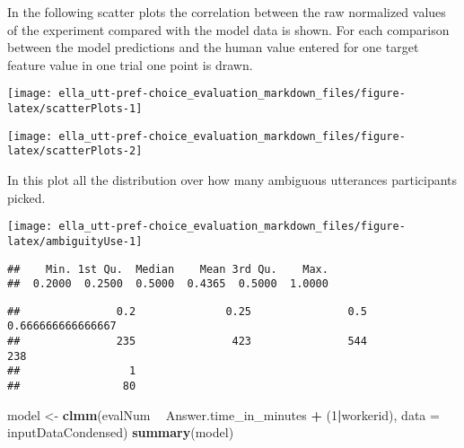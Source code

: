 \documentclass[]{article}
\newenvironment{Shaded}{\begin{snugshade}}{\end{snugshade}}
\newcommand{\DataTypeTok}[1]{\textcolor[rgb]{0.13,0.29,0.53}{#1}}
\newcommand{\DecValTok}[1]{\textcolor[rgb]{0.00,0.00,0.81}{#1}}
\newcommand{\KeywordTok}[1]{\textcolor[rgb]{0.13,0.29,0.53}{\textbf{#1}}}
\newcommand{\NormalTok}[1]{#1}
\newcommand{\OperatorTok}[1]{\textcolor[rgb]{0.81,0.36,0.00}{\textbf{#1}}}
\newcommand{\StringTok}[1]{\textcolor[rgb]{0.31,0.60,0.02}{#1}}
\begin{document}
In the following scatter plots the correlation between the raw
normalized values of the experiment compared with the model data is
shown. For each comparison between the model predictions and the human
value entered for one target feature value in one trial one point is
drawn.

\begin{center}\texttt{[image: ella\_utt-pref-choice\_evaluation\_markdown\_files/figure-latex/scatterPlots-1]} \end{center}

\begin{center}\texttt{[image: ella\_utt-pref-choice\_evaluation\_markdown\_files/figure-latex/scatterPlots-2]} \end{center}

In this plot all the distribution over how many ambiguous utterances
participants picked.

\begin{center}\texttt{[image: ella\_utt-pref-choice\_evaluation\_markdown\_files/figure-latex/ambiguityUse-1]} \end{center}

\begin{Shaded}
\end{Shaded}

\begin{verbatim}
##    Min. 1st Qu.  Median    Mean 3rd Qu.    Max. 
##  0.2000  0.2500  0.5000  0.4365  0.5000  1.0000
\end{verbatim}

\begin{Shaded}
\end{Shaded}

\begin{verbatim}
##               0.2              0.25               0.5 0.666666666666667 
##               235               423               544               238 
##                 1 
##                80
\end{verbatim}

\begin{Shaded}
\begin{Highlighting}[]
\NormalTok{model <-}\StringTok{ }\KeywordTok{clmm}\NormalTok{(evalNum }\OperatorTok{~}\StringTok{ }\NormalTok{Answer.time_in_minutes }\OperatorTok{+}\StringTok{ }\NormalTok{(}\DecValTok{1}\OperatorTok{|}\NormalTok{workerid), }\DataTypeTok{data =}\NormalTok{ inputDataCondensed)}
\KeywordTok{summary}\NormalTok{(model)}
\end{Highlighting}
\end{Shaded}
\end{document}
